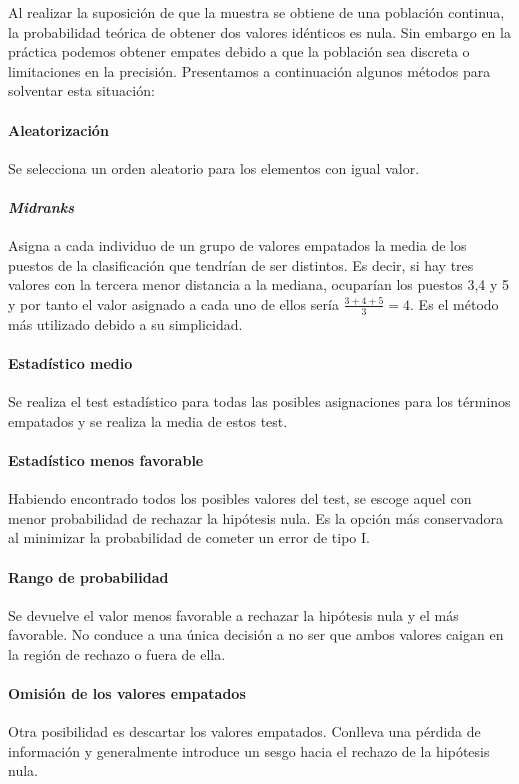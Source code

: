	Al realizar la suposición de que la muestra se obtiene de una población continua, la probabilidad teórica de obtener dos valores idénticos es nula. Sin embargo en la práctica podemos obtener empates debido a que la población sea discreta o limitaciones en la precisión. Presentamos a continuación algunos métodos para solventar esta situación:
	
\paragraph{Aleatorización} Se selecciona un orden aleatorio para los elementos con igual valor.

\paragraph{\textit{Midranks}} Asigna a cada individuo de un grupo de valores empatados la media de los puestos de la clasificación que tendrían de ser distintos. Es decir, si hay tres valores con la tercera menor distancia a la mediana, ocuparían los puestos 3,4 y 5 y por tanto el valor asignado a cada uno de ellos sería $\frac{3+4+5}{3}=4$. Es el método más utilizado debido a su simplicidad. 

\paragraph{Estadístico medio} Se realiza el test estadístico para todas las posibles asignaciones para los términos empatados y se realiza la media de estos test.

\paragraph{Estadístico menos favorable} Habiendo encontrado todos los posibles valores del test, se escoge aquel con menor probabilidad de rechazar la hipótesis nula. Es la opción más conservadora al minimizar la probabilidad de cometer un error de tipo I.

\paragraph{Rango de probabilidad} Se devuelve el valor menos favorable a rechazar la hipótesis nula y el más favorable. No conduce a una única decisión a no ser que ambos valores caigan en la región de rechazo o fuera de ella.

\paragraph{Omisión de los valores empatados} Otra posibilidad es descartar los valores empatados. Conlleva una pérdida de información y generalmente introduce un sesgo hacia el rechazo de la hipótesis nula.
	
	
	
	
	
	
	
	
	
	
	
	
	
	
	
	




